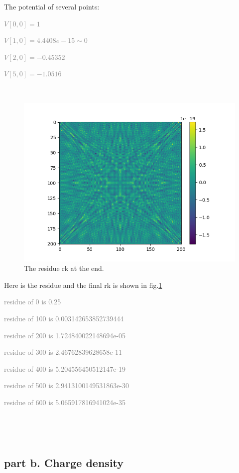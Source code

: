 \documentclass[showpacs, oneside, onecolumn, prl, amsmath, amssymb, nofootinbib, superscriptaddress, notitlepage]{revtex4-1}
\newcommand\bfig{\begin{figure}}
\newcommand\efig{\end{figure}}
\newcommand\gray{\textcolor{gray}}
\begin{document}
The potential of several points:

\gray{$V[0,0]=1$}

\gray{$V[1,0]=4.4408e-15\sim0$}

\gray{$V[2,0]=-0.45352$}

\gray{$V[5,0]=-1.0516$}


~~~~

\bfig
	\centering
	\includegraphics[scale=0.8]{7-2-1 rk.png}
	\caption{The residue rk at the end.}
	\label{7-2-1 rk}
\efig

Here is the residue and the final rk is shown in fig.\ref{7-2-1 rk}

\gray{residue of 0 is 0.25}

\gray{residue of 100 is 0.003142653852739444}

\gray{residue of 200 is 1.724840022148694e-05}

\gray{residue of 300 is 2.46762839628658e-11}

\gray{residue of 400 is 5.204556450512147e-19}

\gray{residue of 500 is 2.9413100149531863e-30}

\gray{residue of 600 is 5.065917816941024e-35}

~~~~

~~~~

\subsection{part b. Charge density}
\end{document}
